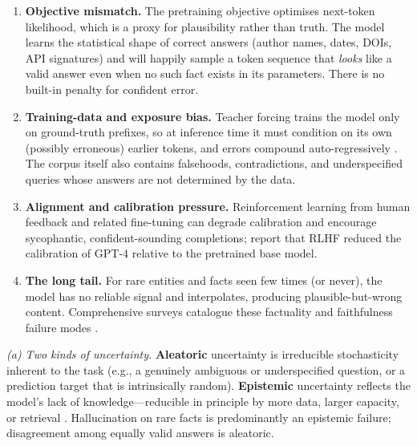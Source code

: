 \documentclass[11pt]{article}
\begin{document}
\begin{enumerate}[leftmargin=*]
  \item \textbf{Objective mismatch.} The pretraining objective optimises next-token likelihood, which is a proxy for plausibility rather than truth. The model learns the statistical shape of correct answers (author names, dates, DOIs, API signatures) and will happily sample a token sequence that \emph{looks} like a valid answer even when no such fact exists in its parameters. There is no built-in penalty for confident error.
  \item \textbf{Training-data and exposure bias.} Teacher forcing trains the model only on ground-truth prefixes, so at inference time it must condition on its own (possibly erroneous) earlier tokens, and errors compound auto-regressively \citep{bengio2015scheduled}. The corpus itself also contains falsehoods, contradictions, and underspecified queries whose answers are not determined by the data.
  \item \textbf{Alignment and calibration pressure.} Reinforcement learning from human feedback and related fine-tuning can degrade calibration and encourage sycophantic, confident-sounding completions; \citet{openai2023gpt4} report that RLHF reduced the calibration of GPT-4 relative to the pretrained base model.
  \item \textbf{The long tail.} For rare entities and facts seen few times (or never), the model has no reliable signal and interpolates, producing plausible-but-wrong content. Comprehensive surveys catalogue these factuality and faithfulness failure modes \citep{ji2023survey}.
\end{enumerate}

\emph{(a) Two kinds of uncertainty.} \textbf{Aleatoric} uncertainty is irreducible stochasticity inherent to the task (e.g., a genuinely ambiguous or underspecified question, or a prediction target that is intrinsically random). \textbf{Epistemic} uncertainty reflects the model's lack of knowledge---reducible in principle by more data, larger capacity, or retrieval \citep{kendall2017uncertainties}. Hallucination on rare facts is predominantly an epistemic failure; disagreement among equally valid answers is aleatoric.
\end{document}
